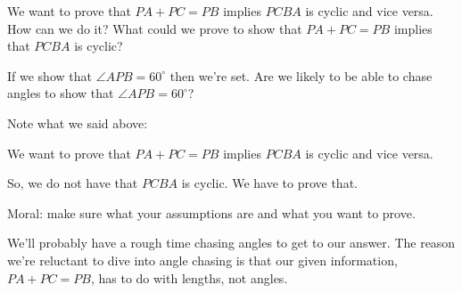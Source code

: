 








We want to prove that $PA + PC = PB$ implies $PCBA$ is cyclic and vice versa. How can we do it? What could we prove to show that $PA + PC = PB$ implies that $PCBA$ is cyclic?

If we show that $\angle APB = 60^\circ$ then we're set. Are we likely to be able to chase angles to show that $\angle APB = 60^\circ$?

Note what we said above:

We want to prove that $PA + PC = PB$ implies $PCBA$ is cyclic and vice versa.

So, we do not have that $PCBA$ is cyclic. We have to prove that.





Moral: make sure what your assumptions are and what you want to prove.

We'll probably have a rough time chasing angles to get to our answer. The reason we're reluctant to dive into angle chasing is that our given information, $PA + PC = PB$, has to do with lengths, not angles.

